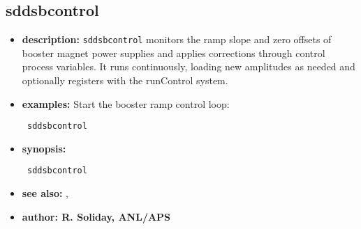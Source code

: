 %
%
\begin{latexonly}
\newpage
\end{latexonly}

\subsection{sddsbcontrol}
\label{sddsbcontrol}

\begin{itemize}
\item {\bf description:}
\verb+sddsbcontrol+ monitors the ramp slope and zero offsets of booster magnet power supplies and applies corrections through control process variables. It runs continuously, loading new amplitudes as needed and optionally registers with the runControl system.

\item {\bf examples:}
Start the booster ramp control loop:
\begin{flushleft}{\tt
sddsbcontrol\\
}\end{flushleft}

\item {\bf synopsis:}
\begin{flushleft}{\tt
sddsbcontrol\\
}\end{flushleft}

\item {\bf see also:} , 

\item {\bf author: R. Soliday, ANL/APS}
\end{itemize}
